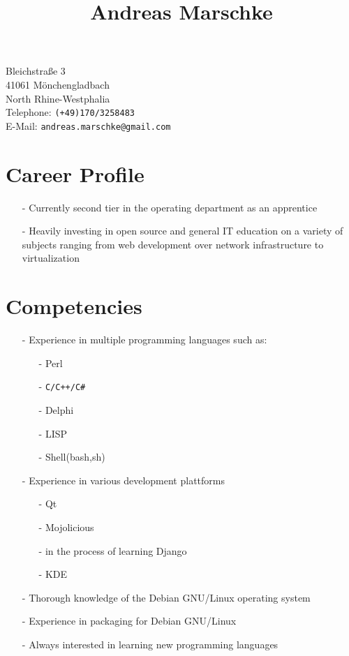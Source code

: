 \documentclass[11pt]{article}
\title{Andreas Marschke}
\date{}
\begin{document}
\maketitle

Bleichstraße 3 \\
41061 Mönchengladbach \\
North Rhine-Westphalia \\
Telephone: \texttt{(+49)170/3258483} \\
E-Mail: \texttt{andreas.marschke@gmail.com}


\section*{Career Profile}


\begin{itemize}
  \item[-] Currently second tier in the operating department as an apprentice
  \item[-] Heavily investing in open source and general IT education
    on a variety of subjects ranging from web development over network
    infrastructure to virtualization
\end{itemize}

\section*{Competencies}

\thispagestyle{empty}
\begin{itemize}
  \item[-] Experience in multiple programming languages such as:
    \begin{itemize}
      \item[-] Perl
      \item[-] \verb*|C/C++/C#|
      \item[-] Delphi
      \item[-] LISP
      \item[-] Shell(bash,sh)
    \end{itemize}

  \item[-] Experience in various development plattforms
    \begin{itemize}
      \item[-] Qt
      \item[-] Mojolicious
      \item[-] in the process of learning Django
      \item[-] KDE
    \end{itemize}
  \item[-] Thorough knowledge of the Debian GNU/Linux operating
    system
  \item[-] Experience in packaging for Debian GNU/Linux
  \item[-] Always interested in learning new programming
    languages
\end{itemize}
\end{document}
